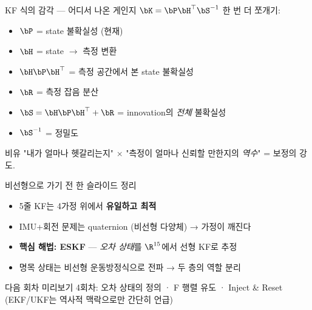 \begin{frame}{KF 식의 감각 — 어디서 나온 게인지}
  \footnotesize
  $\bK = \bP\bH^\top \bS^{-1}$ 한 번 더 쪼개기:
  \begin{itemize}
    \item $\bP$ = state 불확실성 (현재)
    \item $\bH$ = state $\to$ 측정 변환
    \item $\bH \bP \bH^\top$ = 측정 공간에서 본 state 불확실성
    \item $\bR$ = 측정 잡음 분산
    \item $\bS = \bH\bP\bH^\top + \bR$ = innovation의 \emph{전체} 불확실성
    \item $\bS^{-1}$ = 정밀도
  \end{itemize}
  \pause
  \vspace{0.2em}
  \begin{block}{비유}
    "내가 얼마나 헷갈리는지" $\times$ "측정이 얼마나 신뢰할 만한지의 \emph{역수}" = 보정의 강도.
  \end{block}
\end{frame}

\begin{frame}{비선형으로 가기 전 한 슬라이드 정리}
  \begin{itemize}
    \item 5줄 KF는 4가정 위에서 \textbf{유일하고 최적}
    \item IMU+회전 문제는 quaternion (비선형 다양체) → 가정이 깨진다
    \item \textbf{핵심 해법: ESKF} — \emph{오차 상태}를 $\R^{15}$에서 선형 KF로 추정
    \item 명목 상태는 비선형 운동방정식으로 전파 → 두 층의 역할 분리
  \end{itemize}
  \pause
  \vspace{0.3em}
  \begin{block}{다음 회차 미리보기}
    4회차: 오차 상태의 정의 · F 행렬 유도 · Inject \& Reset \\
    (EKF/UKF는 역사적 맥락으로만 간단히 언급)
  \end{block}
\end{frame}

